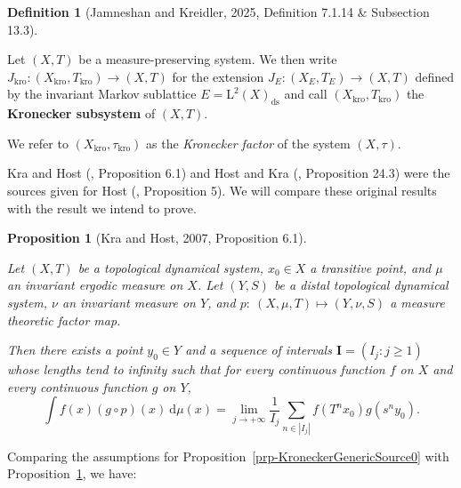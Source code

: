 \documentclass[
  british,
]{article}
\theoremstyle{plain}
\newtheorem{proposition}{Proposition}[section]
\theoremstyle{definition}
\newtheorem{definition}{Definition}[section]
\theoremstyle{plain}
\theoremstyle{remark}
\newcommand{\CountingMeasure}[1]{{\left|#1\right|}}
\newcommand{\KroneckerFactorMap}{p}
\newcommand{\Measure}{{\mu}}
\newcommand{\Topology}{{\tau}}
\begin{document}
\begin{definition}[{Jamneshan and Kreidler, 2025, Definition 7.1.14 \&
Subsection
13.3}]\protect\hypertarget{def-KroneckerFactor}{}\label{def-KroneckerFactor}

Let \((X,T)\) be a measure-preserving system. We then write
\(J_\text{kro}:(X_\text{kro},T_\text{kro})\rightarrow(X,T)\) for the
extension \(J_E:(X_E,T_E)\rightarrow(X,T)\) defined by the invariant
Markov sublattice \(E=\text{L}^2(X)_\text{ds}\) and call
\((X_\text{kro},T_\text{kro})\) the \textbf{Kronecker subsystem} of
\((X,T)\).

We refer to \((X_\text{kro},\Topology_\text{kro})\) as the
\emph{Kronecker factor} of the system \((X,\Topology)\).

\end{definition}

Kra and Host (, Proposition 6.1)
and Host and Kra (, Proposition
24.3) were the sources given for Host
(, Proposition 5). We will compare
these original results with the result we intend to prove.

\begin{proposition}[{Kra and Host, 2007, Proposition
6.1}]\protect\hypertarget{prp-KroneckerGenericSource1}{}\label{prp-KroneckerGenericSource1}

Let \((X,T)\) be a topological dynamical system, \(x_0\in X\) a
transitive point, and \(\Measure\) an invariant ergodic measure on
\(X\). Let \((Y,S)\) be a distal topological dynamical system, \(\nu\)
an invariant measure on \(Y\), and
\(\KroneckerFactorMap:\ (X,\Measure,T)\mapsto(Y,\nu,S)\) a measure
theoretic factor map.

Then there exists a point \(y_0\in Y\) and a sequence of intervals
\(\boldsymbol{I}=(I_j:j\geq1)\) whose lengths tend to infinity such that
for every continuous function \(f\) on \(X\) and every continuous
function \(g\) on \(Y\),
\[\int f(x)(g\circ\KroneckerFactorMap)(x)\ \mathrm{d}\Measure(x) = \lim_{j\rightarrow+\infty}\frac{1}{I_j}\sum_{n\in \CountingMeasure{I_j}}f(T^nx_0)g(s^ny_0). \]

\end{proposition}

Comparing the assumptions for
Proposition~\ref{prp-KroneckerGenericSource0} with
Proposition~\ref{prp-KroneckerGenericSource1}, we have:
\end{document}
